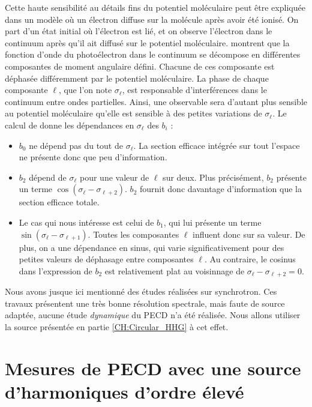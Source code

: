 Cette haute sensibilité au détails fins du potentiel moléculaire peut être expliquée dans un modèle où un électron diffuse sur la molécule après avoir été ionisé. On part d'un état initial où l'électron est lié, et on observe l'électron dans le continuum après qu'il ait diffusé sur le potentiel moléculaire.  montrent que la fonction d'onde du photoélectron dans le continuum se décompose en différentes composantes de moment angulaire défini. Chacune de ces composante est déphasée différemment par le potentiel moléculaire. La phase de chaque composante $\ell$, que l'on note $\sigma_\ell$, est responsable d'interférences dans le continuum entre ondes partielles. Ainsi, une observable sera d'autant plus sensible au potentiel moléculaire qu'elle est sensible à des petites variations de $\sigma_\ell$. Le calcul de  donne les dépendances en $\sigma_\ell$ des $b_i$ :

\begin{itemize}
\renewcommand{\labelitemi}{$\bullet$}
\setlength\itemsep{1em}
\item $b_0$ ne dépend pas du tout de $\sigma_\ell$. La section efficace intégrée sur tout l'espace ne présente donc que peu d'information.
\item $b_2$ dépend de $\sigma_\ell$ pour une valeur de $\ell$ sur deux. Plus précisément, $b_2$ présente un terme $\cos(\sigma_\ell-\sigma_{\ell+2})$. $b_2$ fournit donc davantage d'information que la section efficace totale.
\item Le cas qui nous intéresse est celui de $b_1$, qui lui présente un terme $\sin(\sigma_\ell-\sigma_{\ell+1})$. Toutes les composantes $\ell$ influent donc sur sa valeur. De plus, on a une dépendance en sinus, qui varie significativement pour des petites valeurs de déphasage entre composantes $\ell$. Au contraire, le cosinus dans l'expression de $b_2$ est relativement plat au voisinnage de $\sigma_\ell-\sigma_{\ell+2} = 0$.
\end{itemize}

Nous avons jusque ici mentionné des études réalisées sur synchrotron. Ces travaux présentent une très bonne résolution spectrale, mais faute de source adaptée, aucune étude \textit{dynamique} du PECD n'a été réalisée. Nous allons utiliser la source présentée en partie \ref{CH:Circular_HHG} à cet effet.
%
\chapter{Mesures de PECD avec une source d'harmoniques d'ordre élevé}
